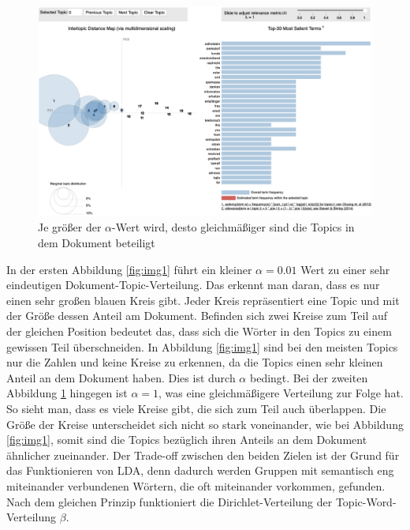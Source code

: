 \documentclass[german,version-2020-11]{uzl-thesis}
\begin{document}
\begin{figure}[H]
\begin{center}
\includegraphics[scale=0.315]{lda_alpha1.png}
\caption{Je größer der $\alpha$-Wert wird, desto gleichmäßiger sind die Topics in dem Dokument beteiligt}
\label{fig:img2}
\end{center}
\end{figure}

In der ersten Abbildung \ref{fig:img1} führt ein kleiner $\alpha = 0.01$ Wert zu einer sehr eindeutigen Dokument-Topic-Verteilung. Das erkennt man daran, dass es nur einen sehr großen blauen Kreis gibt. Jeder Kreis repräsentiert eine Topic und mit der Größe dessen Anteil am Dokument. Befinden sich zwei Kreise zum Teil auf der gleichen Position bedeutet das, dass sich die Wörter in den Topics zu einem gewissen Teil überschneiden. In Abbildung \ref{fig:img1} sind bei den meisten Topics nur die Zahlen und keine Kreise zu erkennen, da die Topics einen sehr kleinen Anteil an dem Dokument haben. Dies ist durch $\alpha$ bedingt. Bei der zweiten Abbildung \ref{fig:img2} hingegen ist $\alpha = 1$, was eine gleichmäßigere Verteilung zur Folge hat. So sieht man, dass es viele Kreise gibt, die sich zum Teil auch überlappen. Die Größe der Kreise unterscheidet sich nicht so stark voneinander, wie bei Abbildung \ref{fig:img1}, somit sind die Topics bezüglich ihren Anteils an dem Dokument ähnlicher zueinander. Der Trade-off zwischen den beiden Zielen ist der Grund für das Funktionieren von LDA, denn dadurch werden Gruppen mit semantisch eng miteinander verbundenen Wörtern, die oft miteinander vorkommen, gefunden. Nach dem gleichen Prinzip funktioniert die Dirichlet-Verteilung der Topic-Word-Verteilung $\beta$. \\
\end{document}
